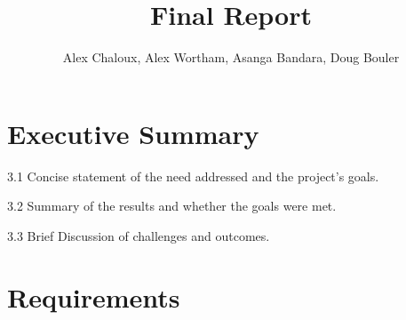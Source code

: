 \documentclass[12pt,letterpaper]{article}
\title{Final Report}
\author{Alex Chaloux, Alex Wortham, Asanga Bandara, Doug Bouler}
\begin{document}
\reqstitlepage

\tableofcontents
\clearpage
{}

\section{Executive Summary}


3.1 Concise statement of the need addressed and the project's goals.

3.2 Summary of the results and whether the goals were met.

3.3 Brief Discussion of challenges and outcomes.

\clearpage
\section{Requirements}
\end{document}
